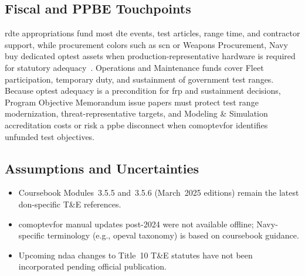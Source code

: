 \documentclass[../main.tex]{subfiles}
\begin{document}
\subsection{Fiscal and PPBE Touchpoints}
\ac{rdte} appropriations fund most \ac{dte} events, test articles, range time, and contractor support, while procurement colors such as \ac{scn} or Weapons Procurement, Navy buy dedicated \ac{optest} assets when production-representative hardware is required for statutory adequacy~\autocite{DoDFMR-Vol3,edo-3-5-5-test-eval-part-i-2025}. Operations and Maintenance funds cover Fleet participation, temporary duty, and sustainment of government test ranges. Because \ac{optest} adequacy is a precondition for \ac{frp} and sustainment decisions, Program Objective Memorandum issue papers must protect test range modernization, threat-representative targets, and Modeling \& Simulation accreditation costs or risk a \ac{ppbe} disconnect when \ac{comoptevfor} identifies unfunded test objectives.

\subsection{Assumptions and Uncertainties}
\begin{itemize}
	\item Coursebook Modules~3.5.5 and~3.5.6 (March~2025 editions) remain the latest \ac{don}-specific T\&E references.
	\item \ac{comoptevfor} manual updates post-2024 were not available offline; Navy-specific terminology (e.g., \ac{opeval} taxonomy) is based on coursebook guidance.
	\item Upcoming \ac{ndaa} changes to Title~10 T\&E statutes have not been incorporated pending official publication.
\end{itemize}

\end{document}
